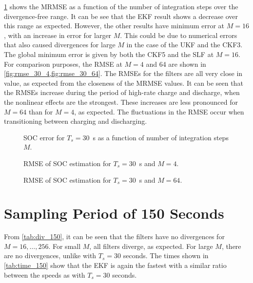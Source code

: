 \documentclass[../zhang_thesis.tex]{subfiles}
\begin{document}
\cref{fig:mrmse_30} shows the MRMSE as a function of the number of integration steps over the divergence-free range. It can be see that the EKF result shows a decrease over this range as expected. However, the other results have minimum error at $M=16$, with an increase in error for larger $M$. This could be due to numerical errors that also caused divergences for large $M$ in the case of the UKF and the CKF3. The global minimum error is given by both the CKF5 and the SLF at $M=16$. For comparison purposes, the RMSE at $M=4$ and 64 are shown in \cref{fig:rmse_30_4,fig:rmse_30_64}. The RMSEs for the filters are all very close in value, as expected from the closeness of the MRMSE values. It can be seen that the RMSEs increase during the period of high-rate charge and discharge, when the nonlinear effects are the strongest. These increases are less pronounced for $M=64$ than for $M=4$, as expected. The fluctuations in the RMSE occur when transitioning between charging and discharging.

\begin{figure}[b]
\centering

\caption{SOC error for $T_s=30$~s as a function of number of integration steps $M$.}
\label{fig:mrmse_30}
\end{figure}

\begin{figure}
\centering

\caption{RMSE of SOC estimation for $T_s=30$~s and $M=4$.}
\label{fig:rmse_30_4}
\end{figure}

\begin{figure}
\centering

\caption{RMSE of SOC estimation for $T_s=30$~s and $M=64$.}
\label{fig:rmse_30_64}
\end{figure}

\clearpage

\section{Sampling Period of 150 Seconds}

From \cref{tab:div_150}, it can be seen that the filters have no divergences for $M=16,\dots,256$. For small $M$, all filters diverge, as expected. For large $M$, there are no divergences, unlike with $T_s=30$ seconds. The times shown in \cref{tab:time_150} show that the EKF is again the fastest with a similar ratio between the speeds as with $T_s=30$ seconds. 
\end{document}
